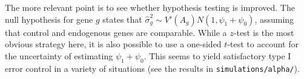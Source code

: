 \documentclass{article}
\begin{document}
The more relevant point is to see whether hypothesis testing is improved.
The null hypothesis for gene $g$ states that $\hat\sigma^2_g  \sim V'(A_g)N(1, \psi_1 + \psi_0)$, assuming that control and endogenous genes are comparable.
While a $z$-test is the most obvious strategy here, it is also possible to use a one-sided $t$-test to account for the uncertainty of estimating $\psi_1 + \psi_0$.
This seems to yield satisfactory type I error control in a variety of situations (see the results in \texttt{simulations/alpha/}).




\end{document}
